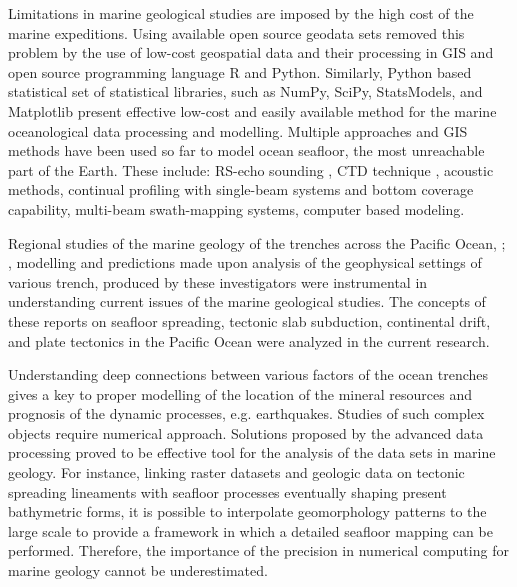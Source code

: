 \documentclass[11pt,a4paper]{report}
\begin{document}
Limitations in marine geological studies are imposed by the high cost of the marine expeditions. Using available open source geodata sets removed this problem by the use of low-cost geospatial data and their processing in \ac{GIS} and open source programming language R and Python. Similarly, Python based statistical set of statistical libraries, such as \ac{NumPy}, \ac{SciPy}, \ac{StatsModels}, and Matplotlib present effective low-cost and easily available method for the marine oceanological data processing and modelling. Multiple approaches and \ac{GIS} methods have been used so far to model ocean seafloor, the most unreachable part of the Earth. These include: \ac{RS}-echo sounding \cite{SmithSandwell1997a}, \ac{CTD} technique \cite{Tairaetal2005}, acoustic methods, continual profiling with single-beam systems and bottom coverage capability, multi-beam swath-mapping systems, computer based modeling.

Regional studies of the marine geology of the trenches across the Pacific Ocean, \cite{Bello-Gonzalezetal2018}; \cite{Bostonetal2017}, modelling and predictions made upon analysis of the geophysical settings of various trench, produced by these investigators were instrumental in understanding current issues of the marine geological studies. The concepts of these reports on seafloor spreading, tectonic slab subduction, continental drift, and plate tectonics in the Pacific Ocean were analyzed in the current research.  

Understanding deep connections between various factors of the ocean trenches gives a key to proper modelling of the location of the mineral resources and prognosis of the dynamic processes, e.g. earthquakes. Studies of such complex objects require numerical approach. Solutions proposed by the advanced data processing proved to be effective tool for the analysis of the data sets in marine geology. For instance, linking raster datasets and geologic data on tectonic spreading lineaments with seafloor processes eventually shaping present bathymetric forms, it is possible to interpolate geomorphology patterns to the large scale to provide a framework in which a detailed seafloor mapping can be performed. Therefore, the importance of the precision in numerical computing for marine geology cannot be underestimated. 
\end{document}
